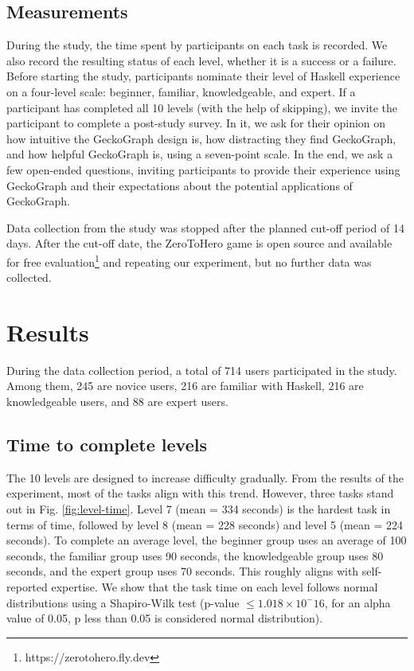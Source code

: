 \documentclass[preprint,12pt]{elsarticle}
\begin{document}
\subsection{Measurements}
During the study, the time spent by participants on each task is recorded. We also record the resulting status of each level, whether it is a success or a failure. Before starting the study, participants nominate their level of Haskell experience on a four-level scale: beginner, familiar,  knowledgeable, and expert.  If a participant has completed all 10 levels (with the help of skipping), we invite the participant to complete a post-study survey. In it, we ask for their opinion on how intuitive the GeckoGraph design is, how distracting they find GeckoGraph, and how helpful GeckoGraph is, using a seven-point scale. In the end, we ask a few open-ended questions, inviting participants to provide their experience using GeckoGraph and their expectations about the potential applications of GeckoGraph.

Data collection from the study was stopped after the planned cut-off period of 14 days. After the cut-off date, the ZeroToHero game is open source and available for free evaluation\footnote{https://zerotohero.fly.dev} and repeating our experiment, but no further data was collected. 

\section{Results}

During the data collection period, a total of 714 users participated in the study. Among them, 245 are novice users, 216 are familiar with Haskell, 216 are knowledgeable users, and 88 are expert users. 

\subsection{Time to complete levels}

The 10 levels are designed to increase difficulty gradually. From the results of the experiment, most of the tasks align with this trend. However, three tasks stand out in Fig. \ref{fig:level-time}.  Level 7 (mean = 334 seconds) is the hardest task in terms of time, followed by level 8 (mean = 228 seconds) and level 5 (mean = 224 seconds). To complete an average level, the beginner group uses an average of 100 seconds, the familiar group uses 90 seconds, the knowledgeable group uses 80 seconds, and the expert group uses 70 seconds. This roughly aligns with self-reported expertise. We show that the task time on each level follows normal distributions using a Shapiro-Wilk test \cite{Shaphiro1965-dx} (p-value  $ \leq 1.018 \times 10^-16$, for an alpha value of 0.05, p less than 0.05 is considered normal distribution).
\end{document}
